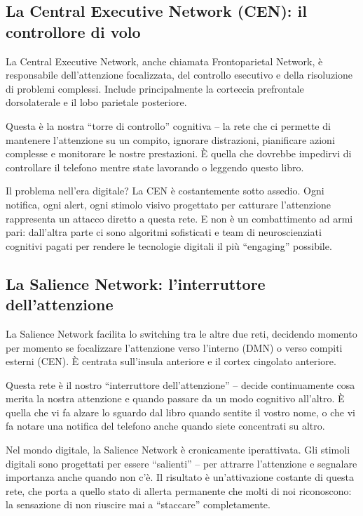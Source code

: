\subsection{La Central Executive Network (CEN): il controllore di volo}

La Central Executive Network, anche chiamata Frontoparietal Network, è responsabile dell'attenzione focalizzata, del controllo esecutivo e della risoluzione di problemi complessi. Include principalmente la corteccia prefrontale dorsolaterale e il lobo parietale posteriore.

Questa è la nostra ``torre di controllo'' cognitiva – la rete che ci permette di mantenere l'attenzione su un compito, ignorare distrazioni, pianificare azioni complesse e monitorare le nostre prestazioni. È quella che dovrebbe impedirvi di controllare il telefono mentre state lavorando o leggendo questo libro.

Il problema nell'era digitale? La CEN è costantemente sotto assedio. Ogni notifica, ogni alert, ogni stimolo visivo progettato per catturare l'attenzione rappresenta un attacco diretto a questa rete. E non è un combattimento ad armi pari: dall'altra parte ci sono algoritmi sofisticati e team di neuroscienziati cognitivi pagati per rendere le tecnologie digitali il più ``engaging'' possibile.

\subsection{La Salience Network: l'interruttore dell'attenzione}

La Salience Network facilita lo switching tra le altre due reti, decidendo momento per momento se focalizzare l'attenzione verso l'interno (DMN) o verso compiti esterni (CEN). È centrata sull'insula anteriore e il cortex cingolato anteriore.

Questa rete è il nostro ``interruttore dell'attenzione'' – decide continuamente cosa merita la nostra attenzione e quando passare da un modo cognitivo all'altro. È quella che vi fa alzare lo sguardo dal libro quando sentite il vostro nome, o che vi fa notare una notifica del telefono anche quando siete concentrati su altro.

Nel mondo digitale, la Salience Network è cronicamente iperattivata. Gli stimoli digitali sono progettati per essere ``salienti'' – per attrarre l'attenzione e segnalare importanza anche quando non c'è. Il risultato è un'attivazione costante di questa rete, che porta a quello stato di allerta permanente che molti di noi riconoscono: la sensazione di non riuscire mai a ``staccare'' completamente.

